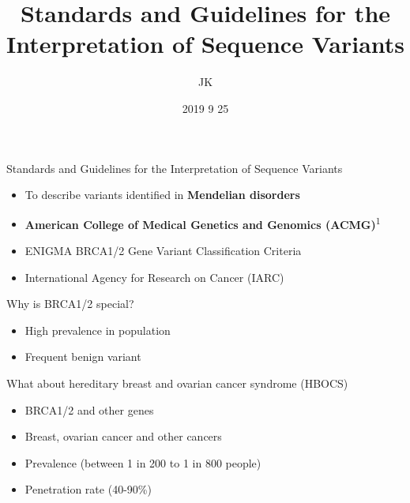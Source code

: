 \documentclass[
  ignorenonframetext,
]{beamer}
\title{Standards and Guidelines for the Interpretation of Sequence Variants}
\author{JK}
\date{2019 9 25}
\providecommand{\tightlist}{%
  \setlength{\itemsep}{0pt}\setlength{\parskip}{0pt}}
\begin{document}
\frame{\titlepage}

\begin{frame}{Standards and Guidelines for the Interpretation of
Sequence Variants}
\protect\hypertarget{standards-and-guidelines-for-the-interpretation-of-sequence-variants}{}

\begin{itemize}
\tightlist
\item
  To describe variants identified in \textbf{Mendelian disorders}\\
\item
  \textbf{American College of Medical Genetics and Genomics
  (ACMG)}\textsuperscript{1}
\item
  ENIGMA BRCA1/2 Gene Variant Classification Criteria\\
\item
  International Agency for Research on Cancer (IARC)
\end{itemize}

\end{frame}

\begin{frame}{Why is BRCA1/2 special?}
\protect\hypertarget{why-is-brca12-special}{}

\begin{itemize}
\tightlist
\item
  High prevalence in population\\
\item
  Frequent benign variant
\end{itemize}

\end{frame}

\begin{frame}{What about hereditary breast and ovarian cancer syndrome
(HBOCS)}
\protect\hypertarget{what-about-hereditary-breast-and-ovarian-cancer-syndrome-hbocs}{}

\begin{itemize}
\tightlist
\item
  BRCA1/2 and other genes\\
\item
  Breast, ovarian cancer and other cancers\\
\item
  Prevalence (between 1 in 200 to 1 in 800 people)
\item
  Penetration rate (40-90\%)
\end{itemize}

\end{frame}
\end{document}
